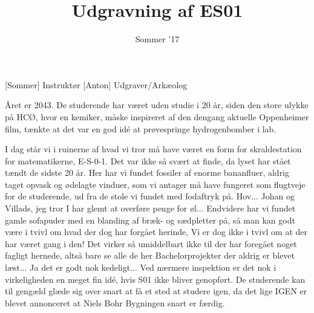\documentclass[a4paper,11pt]{article}
\title{Udgravning af ES01}
\author{Sommer '17}
\begin{document}
\maketitle

\begin{roles}
[Sommer] Instruktør
[Anton] Udgraver/Arkæolog
\end{roles}

\begin{sketch}

 Året er 2043. De studerende har været uden studie i 20 år, siden den store ulykke på HCØ, hvor en kemiker, måske inspireret af den dengang aktuelle Oppenheimer film, tænkte at det var en god idé at prøvespringe hydrogenbomber i lab. 

 I dag står vi i ruinerne af hvad vi tror må have været en form for skraldestation for matematikerne, E-S-0-1. Det var ikke så svært at finde, da lyset har stået tændt de sidste 20 år.  Her har vi fundet fossiler af enorme bananfluer, aldrig taget opvask og ødelagte vinduer, som vi antager må have fungeret som flugtveje for de studerende, ud fra de stole vi fundet med fodaftryk på.
  Hov... Johan og Villads, jeg tror I har glemt at overføre penge for øl...
 Endvidere har vi fundet gamle sofapuder med en blanding af  bræk- og  sædpletter på, så man kan godt være i tvivl om hvad der dog har forgået herinde, 
  Vi er dog ikke i tvivl om at der har været gang i den!
 Det virker så umiddelbart ikke til der har foregået noget fagligt hernede, altså bare se alle de her Bachelorprojekter der aldrig er blevet læst...  Ja det er godt nok kedeligt...
 Ved nærmere inspektion er det nok i virkeligheden en meget fin idé, hvis S01 ikke bliver genopført.
De studerende kan til gengæld glæde sig over snart at få et sted at studere igen, da det lige IGEN er blevet annonceret at Niels Bohr Bygningen snart er færdig.
\end{sketch}
\end{document}
